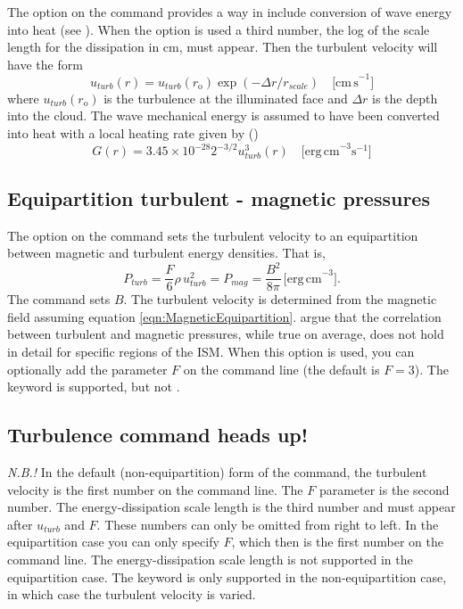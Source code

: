 The  option on the 
command provides a way in include
conversion of wave energy into heat (see \citealp{BottorffFerland2002}).
When
the option is used a third number, the log of the scale length for the
dissipation in cm, must appear.
Then the turbulent velocity will have the form
\begin{equation}
u_{turb} (r) = u_{turb} (r_{\mathrm{o}} )\exp ( - \Delta r/r_{scale} )\quad
\mathrm{[cm\, s}^{-1}]%
\end{equation}
where $u_{turb}(r_{\mathrm{o}})$ is the turbulence at the illuminated face
and $\Delta r$ is the depth into the cloud.
The wave mechanical energy is assumed to have been
converted into heat with a local heating rate given by
(\citealp{BottorffFerland2002})
\begin{equation}
G(r) = 3.45 \times 10^{ - 28} 2^{ - 3/2} u_{turb}^3 (r) \quad
\mathrm{[erg\, cm}^{-3} \mathrm{s}^{-1}]%
\end{equation}

\subsection{Equipartition turbulent - magnetic pressures }

The  option on the  command sets the turbulent
velocity to an equipartition between magnetic and
turbulent energy densities.
That is,
\begin{equation}
\label{eqn:MagneticEquipartition}
P_{turb}  = \frac{F}{6}\rho \,u_{turb}^2  = P_{mag}  = \frac{{B^2 }}{{8\pi
}}\, \mathrm{[erg\, cm}^{-3}].%
\end{equation}
The  command sets $B$.
The turbulent
velocity is determined from the magnetic field
assuming equation \ref{eqn:MagneticEquipartition}.
\citet{HeilesCrutcher2005} argue that the correlation between turbulent and
magnetic pressures, while true on average, does not hold in detail for
specific regions of the ISM. When this option is used, you can optionally add
the parameter $F$ on the command line (the default is $F=3$). The keyword  is
supported, but not .

\subsection{Turbulence command heads up!}

\emph{N.B.!}  In the default (non-equipartition) form of the command, the turbulent velocity is the first number
on the command line.
The $F$ parameter is the second number.
The energy-dissipation scale length is the third number and must appear
after $u_{turb}$ and $F$.
These numbers can only be omitted from right to left.
In the equipartition case you can only specify $F$,
which then is the first number on the command line.
The energy-dissipation scale length is not supported in the equipartition case.
The keyword  is only supported in the non-equipartition case,
in which case the turbulent velocity is varied.

